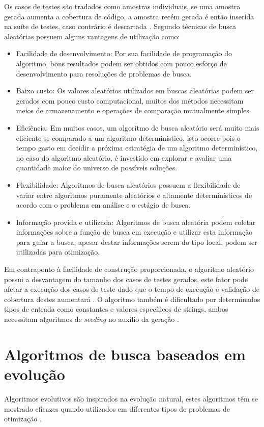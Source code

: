 \documentclass[
	12pt,				%
	oneside,			%
	a4paper,			%
	english,			%
	brazil				%
	]{abntex2ppgsi}
\begin{document}
Os casos de testes são tradados como amostras individuais, se uma amostra gerada aumenta a cobertura de código, a amostra recém gerada é então inserida na suíte de testes, caso contrário é descartada \cite{Campos2017}. Segundo \cite{Karnopp63} técnicas de busca aleatórias possuem alguns vantagens de utilização como:

\begin{itemize}
	\item Facilidade de desenvolvimento: Por sua facilidade de programação do algoritmo, bons resultados podem ser obtidos com pouco esforço de desenvolvimento para resoluções de problemas de busca.
	\item Baixo custo: Os valores aleatórios utilizados em buscas aleatórias podem ser gerados com pouco custo computacional, muitos dos métodos necessitam meios de armazenamento e operações de comparação mutualmente simples.
	\item Eficiência: Em muitos casos, um algoritmo de busca aleatório será muito mais eficiente se comparado a um algoritmo determinístico, isto ocorre pois o tempo gasto em decidir a próxima estratégia de um algoritmo determinístico, no caso do algoritmo aleatório, é investido em explorar e avaliar uma quantidade maior do universo de possíveis soluções.
	\item Flexibilidade: Algoritmos de busca aleatórios possuem a flexibilidade de variar entre algoritmos puramente aleatórios e altamente determinísticos de acordo com o problema em análise e o estágio de busca.
	\item Informação provida e utilizada: Algoritmos de busca aleatória podem coletar informações sobre a função de busca em execução e utilizar esta informação para guiar a busca, apesar destar informações serem do tipo local, podem ser utilizadas para otimização.
\end{itemize}


Em contraponto à facilidade de construção proporcionada, o algoritmo aleatório possui a desvantagem do tamanho dos casos de testes gerados, este fator pode afetar a execução dos casos de teste dado que o tempo de execução e validação de cobertura destes aumentará \cite{shamriski20151115}. O algoritmo também é dificultado por determinados tipos de entrada como constantes e valores específicos de strings, ambos necessitam algoritmos de \textit{seeding} no auxílio da geração \cite{shamriski20151115}.


\section{Algoritmos de busca baseados em evolução}
Algoritmos evolutivos são inspirados na evolução natural, estes algoritmos têm se mostrado eficazes quando utilizados em diferentes tipos de problemas de otimização \cite{Campos2017}.
\end{document}
